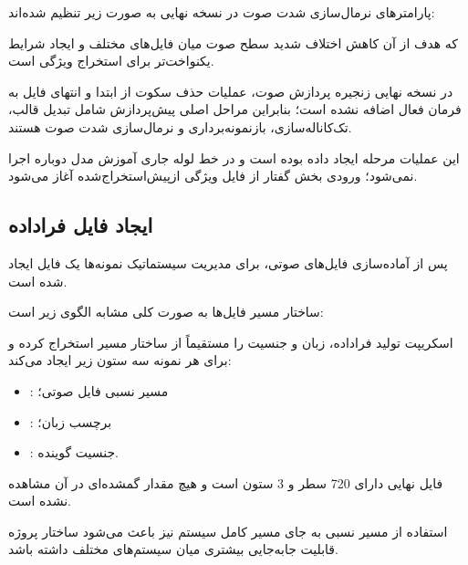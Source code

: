 پارامترهای نرمال‌سازی شدت صوت در نسخه نهایی به صورت زیر تنظیم شده‌اند:

\begin{center}
\end{center}

که هدف از آن کاهش اختلاف شدید سطح صوت میان فایل‌های مختلف و ایجاد شرایط یکنواخت‌تر برای استخراج ویژگی است.

در نسخه نهایی زنجیره پردازش صوت، عملیات حذف سکوت از ابتدا و انتهای فایل به فرمان فعال
اضافه نشده است؛ بنابراین مراحل اصلی پیش‌پردازش شامل تبدیل قالب، تک‌کاناله‌سازی، بازنمونه‌برداری و نرمال‌سازی شدت صوت هستند.

این عملیات مرحله ایجاد داده بوده است و در خط لوله جاری آموزش مدل دوباره اجرا نمی‌شود؛ ورودی بخش گفتار از فایل ویژگی ازپیش‌استخراج‌شده آغاز می‌شود.


\subsection{ایجاد فایل فراداده}

پس از آماده‌سازی فایل‌های صوتی، برای مدیریت سیستماتیک نمونه‌ها یک فایل
ایجاد شده است.

ساختار مسیر فایل‌ها به صورت کلی مشابه الگوی زیر است:

\begin{center}
\end{center}

اسکریپت تولید فراداده، زبان و جنسیت را مستقیماً از ساختار مسیر استخراج کرده و برای هر نمونه سه ستون زیر ایجاد می‌کند:

\begin{itemize}

	\item {}: مسیر نسبی فایل صوتی؛

	\item {}: برچسب زبان؛

	\item {}: جنسیت گوینده.

\end{itemize}

فایل نهایی
دارای 720 سطر و 3 ستون است و هیچ مقدار گمشده‌ای در آن مشاهده نشده است.

استفاده از مسیر نسبی به جای مسیر کامل سیستم نیز باعث می‌شود ساختار پروژه قابلیت جابه‌جایی بیشتری میان سیستم‌های مختلف داشته باشد.

